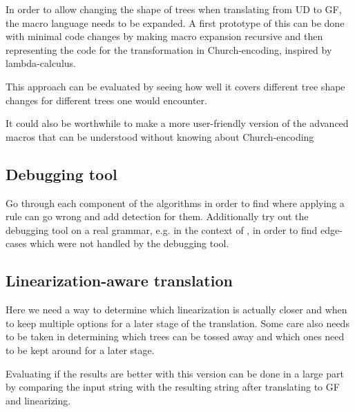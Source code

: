 \documentclass{article}
\begin{document}
In order to allow changing the shape of trees when translating from UD to GF, the macro language needs to be expanded.
A first prototype of this
can be done with minimal code changes by making macro expansion recursive and then representing the code for the transformation in Church-encoding, inspired by lambda-calculus.

This approach can be evaluated by seeing how well it covers different tree shape changes for different trees one would encounter.

It could also be worthwhile to make a more user-friendly version of the advanced macros that can be understood without knowing about Church-encoding

\subsection{Debugging tool}
Go through each component of the algorithms in order to find where applying a rule can go wrong and add detection for them. Additionally try out the debugging tool on a real grammar, e.g. in the context of \cite{listenmaa-etal-2021-towards}, in order to find edge-cases which were not handled by the debugging tool.


\subsection{Linearization-aware translation}
Here we need a way to determine which linearization is actually closer and when to keep multiple options for a later stage of the translation. Some care also needs to be taken in determining which trees can be tossed away and which ones need to be kept around for a later stage.

Evaluating if the results are better with this version can be done in a large part by comparing the input string with the resulting string after translating to GF and linearizing.
\end{document}

